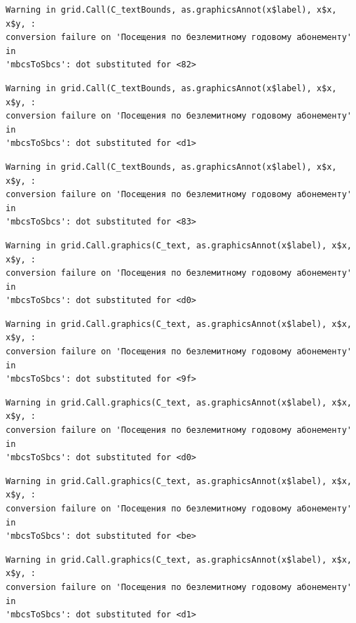 \documentclass[
  letterpaper,
  DIV=11,
  numbers=noendperiod]{scrartcl}
\begin{document}
\begin{verbatim}
Warning in grid.Call(C_textBounds, as.graphicsAnnot(x$label), x$x, x$y, :
conversion failure on 'Посещения по безлемитному годовому абонементу' in
'mbcsToSbcs': dot substituted for <82>
\end{verbatim}

\begin{verbatim}
Warning in grid.Call(C_textBounds, as.graphicsAnnot(x$label), x$x, x$y, :
conversion failure on 'Посещения по безлемитному годовому абонементу' in
'mbcsToSbcs': dot substituted for <d1>
\end{verbatim}

\begin{verbatim}
Warning in grid.Call(C_textBounds, as.graphicsAnnot(x$label), x$x, x$y, :
conversion failure on 'Посещения по безлемитному годовому абонементу' in
'mbcsToSbcs': dot substituted for <83>
\end{verbatim}

\begin{verbatim}
Warning in grid.Call.graphics(C_text, as.graphicsAnnot(x$label), x$x, x$y, :
conversion failure on 'Посещения по безлемитному годовому абонементу' in
'mbcsToSbcs': dot substituted for <d0>
\end{verbatim}

\begin{verbatim}
Warning in grid.Call.graphics(C_text, as.graphicsAnnot(x$label), x$x, x$y, :
conversion failure on 'Посещения по безлемитному годовому абонементу' in
'mbcsToSbcs': dot substituted for <9f>
\end{verbatim}

\begin{verbatim}
Warning in grid.Call.graphics(C_text, as.graphicsAnnot(x$label), x$x, x$y, :
conversion failure on 'Посещения по безлемитному годовому абонементу' in
'mbcsToSbcs': dot substituted for <d0>
\end{verbatim}

\begin{verbatim}
Warning in grid.Call.graphics(C_text, as.graphicsAnnot(x$label), x$x, x$y, :
conversion failure on 'Посещения по безлемитному годовому абонементу' in
'mbcsToSbcs': dot substituted for <be>
\end{verbatim}

\begin{verbatim}
Warning in grid.Call.graphics(C_text, as.graphicsAnnot(x$label), x$x, x$y, :
conversion failure on 'Посещения по безлемитному годовому абонементу' in
'mbcsToSbcs': dot substituted for <d1>
\end{verbatim}
\end{document}
